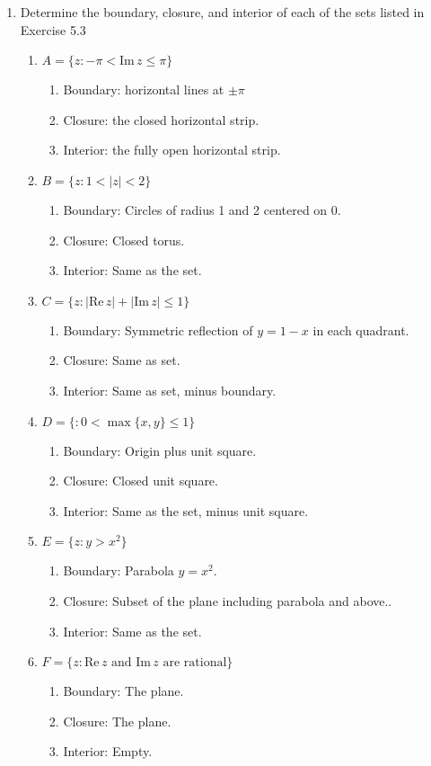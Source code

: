 \documentclass[12pt,a4paper]{article}
\renewcommand{\Im}{\text{Im}\,}
\renewcommand{\Re}{\text{Re}\,}
\begin{document}
\begin{enumerate}[label={\bfseries II.5.\arabic*}]
	\item Determine the boundary, closure, and interior of each of the sets listed in Exercise 5.3

	\begin{enumerate}[label=(\roman*)]
		\item $A = \{z : -\pi < \Im z \leq \pi \}$
			\begin{enumerate}
				\item[] Boundary: horizontal lines at $\pm\pi$
				\item[] Closure: the closed horizontal strip.
				\item[] Interior: the fully open horizontal strip.
			\end{enumerate}
		\item $B = \{ z : 1 < |z| < 2\}$
			\begin{enumerate}
				\item[] Boundary: Circles of radius 1 and 2 centered on 0.
				\item[] Closure: Closed torus.
				\item[] Interior: Same as the set.
			\end{enumerate}
		\item $C = \{ z : |\Re z| + |\Im z| \leq 1\}$
			\begin{enumerate}
				\item[] Boundary: Symmetric reflection of $y=1-x$ in each quadrant.
				\item[] Closure: Same as set.
				\item[] Interior: Same as set, minus boundary.
			\end{enumerate}
		\item $D = \{ : 0 < \max\{x,y\} \leq 1\}$
			\begin{enumerate}
				\item[] Boundary: Origin plus unit square.
				\item[] Closure: Closed unit square.
				\item[] Interior: Same as the set, minus unit square.
			\end{enumerate}
		\item $E = \{z : y > x^2 \}$
			\begin{enumerate}
				\item[] Boundary: Parabola $y=x^2$.
				\item[] Closure: Subset of the plane including parabola and above..
				\item[] Interior: Same as the set.
			\end{enumerate}
		\item $F = \{z : \Re z \text{ and } \Im z \text{ are rational}\}$
			\begin{enumerate}
				\item[] Boundary: The plane.
				\item[] Closure: The plane.
				\item[] Interior: Empty.
			\end{enumerate}
	\end{enumerate}


\end{enumerate}
\end{document}
